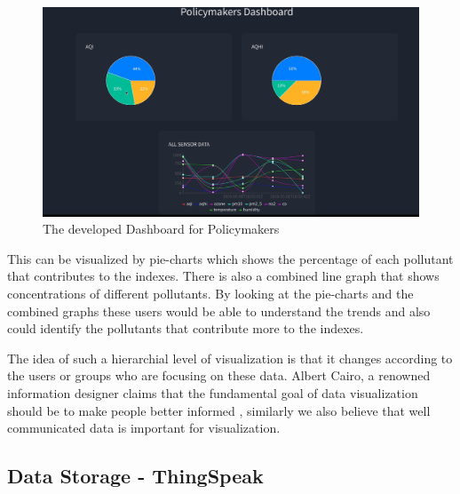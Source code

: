 \begin{figure}[h!]
  \begin{center}
  \includegraphics[scale=0.50]{./images/figure16.png}
  \end{center}
  \caption{The developed Dashboard for Policymakers}
  \label{view3}
\end{figure}

\hspace{1 cm}

This can be visualized by pie-charts which shows the percentage of each pollutant that contributes to the indexes. There is also a combined line graph that shows concentrations of different pollutants. By looking at the pie-charts and the combined graphs these users would be able to understand the trends and also could identify the pollutants that contribute more to the indexes. 

The idea of such a hierarchial level of visualization is that it changes according to the users or groups who are focusing on these data. Albert Cairo, a renowned information designer claims that the fundamental goal of data visualization should be to make people better informed \cite{Hepworth} \cite{Cairo2014},  similarly we also believe that well communicated data is important for visualization.


\subsection{Data Storage - ThingSpeak}

